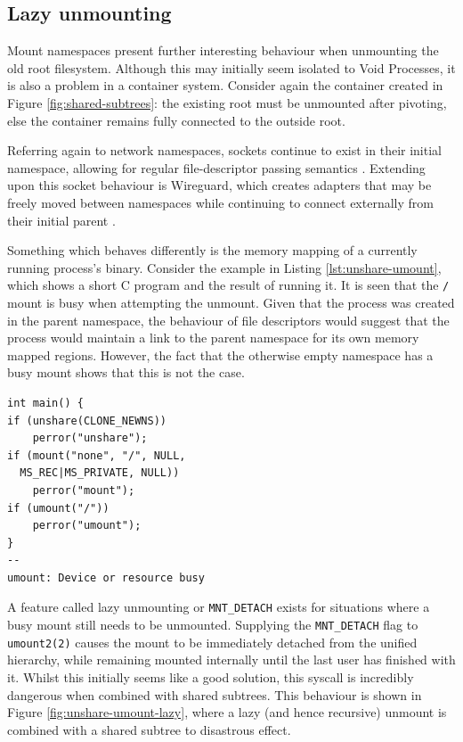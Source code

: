 \documentclass[a4paper,12pt,twoside,openright]{report}
\begin{document}
\subsection{Lazy unmounting}

Mount namespaces present further interesting behaviour when unmounting the old root filesystem. Although this may initially seem isolated to Void Processes, it is also a problem in a container system. Consider again the container created in Figure \ref{fig:shared-subtrees}: the existing root must be unmounted after pivoting, else the container remains fully connected to the outside root.

Referring again to network namespaces, sockets continue to exist in their initial namespace, allowing for regular file-descriptor passing semantics \citep{biederman_re_2007}. Extending upon this socket behaviour is Wireguard, which creates adapters that may be freely moved between namespaces while continuing to connect externally from their initial parent \citep[§7.3]{donenfeld_wireguard_2017}.

Something which behaves differently is the memory mapping of a currently running process's binary. Consider the example in Listing \ref{lst:unshare-umount}, which shows a short C program and the result of running it. It is seen that the \texttt{/} mount is busy when attempting the unmount. Given that the process was created in the parent namespace, the behaviour of file descriptors would suggest that the process would maintain a link to the parent namespace for its own memory mapped regions. However, the fact that the otherwise empty namespace has a busy mount shows that this is not the case.

\begin{lstlisting}[float,label={lst:unshare-umount}]
int main() {
if (unshare(CLONE_NEWNS))
	perror("unshare");
if (mount("none", "/", NULL,
  MS_REC|MS_PRIVATE, NULL))
	perror("mount");
if (umount("/"))
	perror("umount");
}
--
umount: Device or resource busy
\end{lstlisting}

A feature called lazy unmounting or \texttt{MNT\_DETACH} exists for situations where a busy mount still needs to be unmounted. Supplying the \texttt{MNT\_DETACH} flag to \texttt{umount2(2)} causes the mount to be immediately detached from the unified hierarchy, while remaining mounted internally until the last user has finished with it. Whilst this initially seems like a good solution, this syscall is incredibly dangerous when combined with shared subtrees. This behaviour is shown in Figure \ref{fig:unshare-umount-lazy}, where a lazy (and hence recursive) unmount is combined with a shared subtree to disastrous effect.
\end{document}
